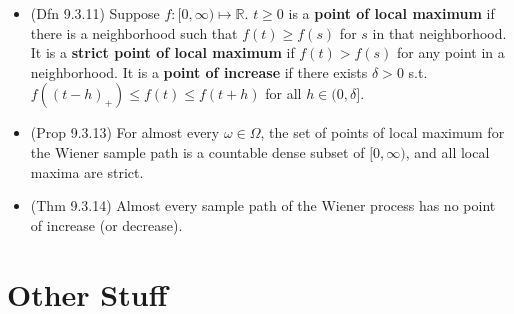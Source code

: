 \documentclass[twoside]{article}
\newcommand\bbR{\mathbb{R}}
\newcommand\dlt{\delta}
\newcommand\om{\omega}
\newcommand\Om{\Omega}
\begin{document}
\begin{itemize}
\item (Dfn 9.3.11) Suppose $f: [0,\infty) \mapsto \bbR$. $t \geq 0$ is a \textbf{point of local maximum} if there is a neighborhood such that $f(t) \geq f(s)$ for $s$ in that neighborhood. It is a \textbf{strict point of local maximum} if $f(t) > f(s)$ for any point in a neighborhood. It is a \textbf{point of increase} if there exists $\dlt > 0$ s.t. $f((t-h)_+) \leq f(t) \leq f(t+h)$ for all $h \in (0, \dlt]$.

\item (Prop 9.3.13) For almost every $\om \in \Om$, the set of points of local maximum for the Wiener sample path is a countable dense subset of $[0,\infty)$, and all local maxima are strict.

\item (Thm 9.3.14) Almost every sample path of the Wiener process has no point of increase (or decrease).

\end{itemize}

\section*{Other Stuff}
\end{document}
